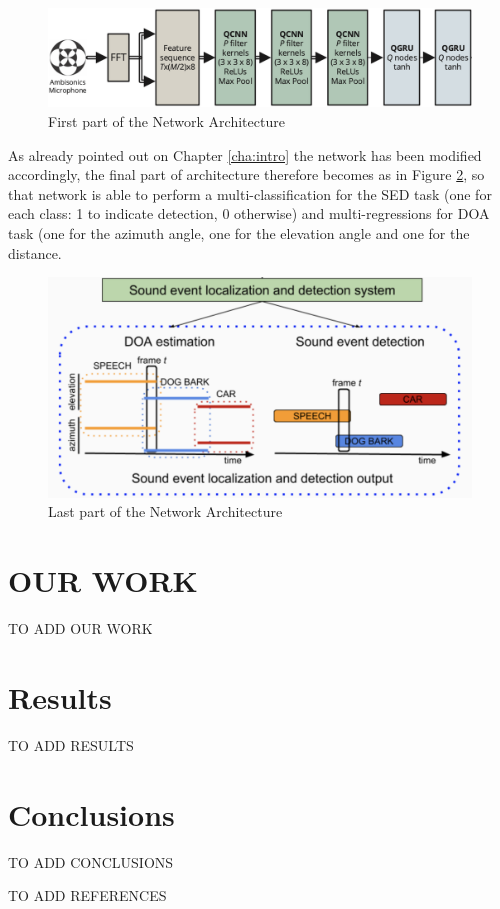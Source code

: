 \documentclass[11pt]{article}
\begin{document}
\begin{figure}[ht]
	\includegraphics[width=\linewidth]{img/arch1.png}
	\caption{First part of the Network Architecture}
	\label{fig:arch1}
\end{figure}

As already pointed out on Chapter \ref{cha:intro} the network has been modified accordingly, the final part of architecture therefore becomes as in Figure \ref{fig:arch2}, so that network is able to perform a multi-classification for the SED task (one for each class: 1 to indicate detection, 0 otherwise) and multi-regressions for DOA task (one for the azimuth angle, one for the elevation angle and one for the distance.

\begin{figure}[ht]
	\centering
	\includegraphics[scale=0.5]{img/arch2.png}
	\caption{Last part of the Network Architecture}
	\label{fig:arch2}
\end{figure}


\section{OUR WORK}

TO ADD OUR WORK


\section{Results}\label{cha:res}

TO ADD RESULTS

\section{Conclusions}\label{cha:conc}

TO ADD CONCLUSIONS

\newpage

TO ADD REFERENCES
\end{document}
